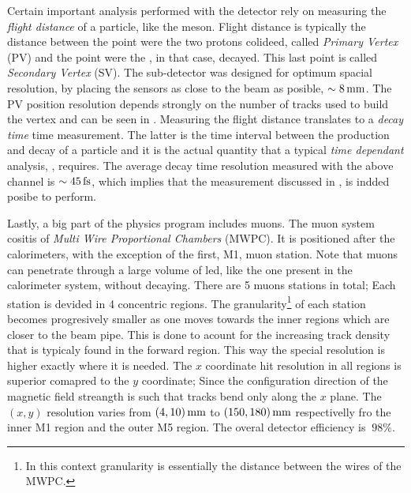 Certain important analysis performed with the \lhcb detector rely on measuring the {\it flight distance} of a particle, like the \Bs meson.
Flight distance is typically the distance between the point were the two protons colideed, called {\it Primary Vertex} (PV)
and the point were the \Bs, in that case, decayed. This last point is called {\it Secondary Vertex} (SV). The \velo sub-detector
was designed for optimum spacial resolution, by placing the \velo sensors as close to the beam as posible, $\sim 8 \rm \,mm$.
The PV position resolution depends strongly on the number of tracks used to build the vertex and can be seen in \figref{}.
Measuring the flight distance translates to a {\it decay time} time measurement. The latter is the time interval between
the production and decay of a particle and it is the actual quantity that a typical {\it time dependant} analysis,
\eg \BsJpsiPhi, requires. The average decay time resolution measured with the above channel is $\sim 45\rm \,fs$, which
implies that the \phis measurement discussed in \secref{}, is indded posibe to perform.

Lastly, a big part of the \lhcb physics program includes muons. The muon system cositis of {\it Multi Wire Proportional Chambers}
(MWPC). It is positioned after the calorimeters, with the exception of the first, M1, muon station.
Note that muons can penetrate through a large volume of led, like the one present in the calorimeter system,
without decaying. There are 5 muons stations in total; Each station is devided in 4 concentric regions.
The granularity\footnote{In this context granularity is essentially the distance between the wires of the MWPC.}
of each station becomes progresively smaller as one moves towards the inner regions which are closer to the beam pipe.
This is done to acount for the increasing track density that is typicaly found in the forward region. This way
the special resolution is higher exactly where it is needed. The $x$ coordinate hit resolution in all regions
is superior comapred to the $y$ coordinate; Since the configuration direction of the \lhcb magnetic field streangth
is such that tracks bend only along the $x$ plane. The $(x,y)$ resolution varies from $(4,10)\rm \,mm$ to $(150,180)\rm \,mm$
respectivelly fro the inner M1 region and the outer M5 region. The overal detector efficiency is $\>98\%$.
